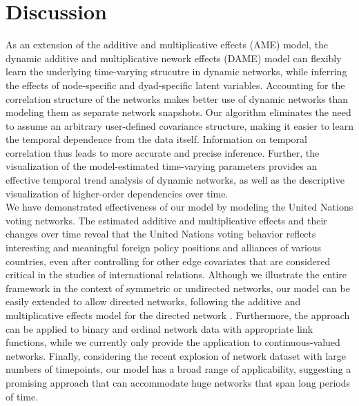 \documentclass[a4paper]{article}
\begin{document}
\section{Discussion}
As an extension of the additive and multiplicative effects (AME) model, the dynamic additive and multiplicative nework effects (DAME) model can flexibly learn the underlying time-varying strucutre in dynamic networks, while inferring the effects of node-specific and dyad-specific latent variables. Accounting for the correlation structure of the networks makes better use of dynamic networks than modeling them as separate network snapshots. Our algorithm eliminates the need to assume an arbitrary user-defined covariance structure, making it easier to learn the temporal dependence from the data itself. Information on temporal correlation thus leads to more accurate and precise inference. Further, the visualization of the model-estimated time-varying parameters provides an effective temporal trend analysis of dynamic networks, as well as the descriptive visualization of higher-order dependencies over time.
\\\newline
We have demonstrated effectiveness of our model by modeling the United Nations voting networks. The estimated additive and multiplicative effects and their changes over time reveal that the United Nations voting behavior reflects interesting and meaningful foreign policy positions and alliances of various countries, even after controlling for other edge covariates that are considered critical in the studies of international relations. Although we illustrate the entire framework in the context of symmetric or undirected networks, our model can be easily extended to allow directed networks, following the additive and multiplicative effects model for the directed network \citep{minhas2016inferential}. Furthermore, the approach can be applied to binary and ordinal network data with appropriate link functions, while we currently only provide the application to continuous-valued networks. Finally, considering the recent explosion of network dataset with large numbers of timepoints, our model has a broad range of applicability, suggesting a promising approach that can accommodate huge networks that span long periods of time.
\newpage


\newpage
\end{document}
